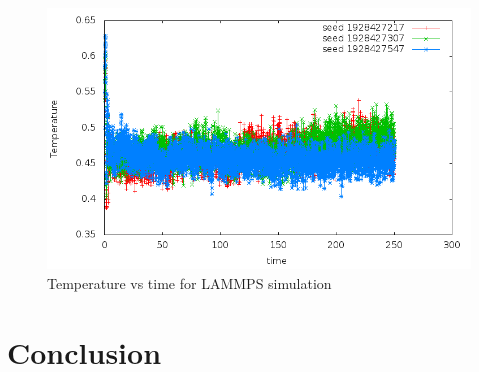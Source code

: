 \documentclass{article}
\begin{document}
\begin{doublespacing}
\begin{figure}[H]
\begin{center}
\includegraphics[scale=0.8]{temp_vs_time} 
\caption{Temperature vs time for LAMMPS simulation}  
\label{TV_lammp} 
\end{center}
\end{figure}

\section{Conclusion}


\end{doublespacing}



\newpage

\end{document}
